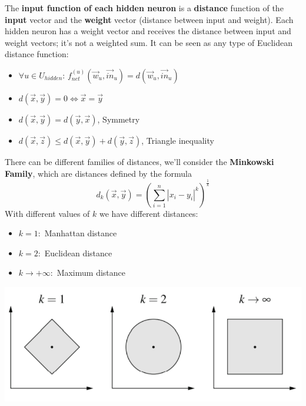 The \textbf{input function of each hidden neuron} is a \textbf{distance} function of the \textbf{input} vector and the \textbf{weight} vector (distance between input and weight). Each hidden neuron has a weight vector and receives the distance between input and weight vectors; it's not a weighted sum. It can be seen as any type of Euclidean distance function: 
\begin{itemize}
	\item $\forall u \in U_{hidden}: \, f_{net}^{(u)} \left(\vec{w}_u, \vec{in}_u \right) = d \left(\vec{w}_u, \vec{in}_u \right)$
	\item $d \left(\vec{x}, \vec{y}\right) = 0 \Leftrightarrow \vec{x} = \vec{y}$
	\item $d \left(\vec{x}, \vec{y}\right) = d \left(\vec{y}, \vec{x}\right)$, Symmetry
	\item $d \left(\vec{x}, \vec{z}\right) \leq d \left(\vec{x}, \vec{y}\right) + d \left(\vec{y}, \vec{z}\right)$, Triangle inequality
\end{itemize}

There can be different families of distances, we'll consider the \textbf{Minkowski Family}, which are distances defined by the formula
$$ d_k \left(\vec{x}, \vec{y}\right) = \left(\sum_{i=1}^n |x_i - y_i|^k \right)^{\frac{1}{k}} $$
With different values of $k$ we have different distances: 
\begin{itemize}
	\item $k = 1:$ Manhattan distance
	\item $k = 2:$ Euclidean distance
	\item $k \rightarrow + \infty:$ Maximum distance
\end{itemize}

\newpage

\begin{center}
	\includegraphics[width=0.7\columnwidth]{img/NN/distances}
\end{center}

